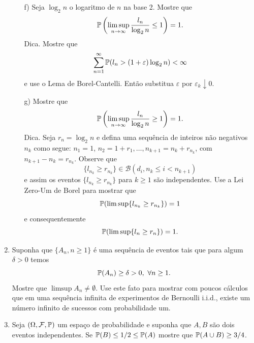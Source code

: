 \begin{enumerate}[leftmargin=*]
\begin{itemize}
	\item[f)]
	Seja $\log_2 n$ o logaritmo de $n$ na base 2. 
	Mostre que 
		\[
			\P\left(
				\limsup_{n\to\infty} \frac{l_n}{\log_2 n}\leq 1
			\right)
			=1.
		\]
	Dica. Mostre que 
		\[
			\sum_{n=1}^{\infty}
			\P(l_n>(1+\varepsilon)\log_2 n)<\infty
		\]
	e use o Lema de Borel-Cantelli. Então substitua $\varepsilon$ 
	por $\varepsilon_k\downarrow 0$.
	
	\item[g)] 
	Mostre que 
		\[
			\P\left(
				\limsup_{n\to\infty} \frac{l_n}{\log_2 n}\geq 1
			\right)
			=1.
		\]
	Dica. Seja $r_n =\log_2 n$ e defina uma sequência 
	de inteiros não negativos $n_k$ como segue:
	$n_1=1$, $n_2=1+r_1,\ldots, n_{k+1}=n_k+r_{n_k}$, com 
	$n_{k+1}-n_{k}=r_{n_k}$.
	Observe que 
		\[
			\{l_{n_k}\geq r_{n_k}\}\in 
			\mathscr{B}(d_i, n_k\leq i <n_{k+1})
		\]
	e assim os eventos $\{l_{n_k}\geq r_{n_k}\}$ para
	$k\geq 1$ são independentes. Use a Lei Zero-Um de Borel
	para mostrar que 
		\[
			\P(\limsup \{ l_{n_k} \geq r_{n_k} \}) = 1
		\]
	e consequentemente 
		\[
			\P(\limsup \{ l_{n} \geq r_{n} \}) = 1.
		\]
		
	\end{itemize}






























\item Suponha que $\{A_n, n\geq 1\}$ é uma sequência de eventos 
tais que para algum $\delta>0$ temos 
	\[
		\P(A_n)\geq \delta >0, \ \forall n\geq 1.
	\]
Mostre que $\limsup A_n \neq \emptyset$.
Use este fato para mostrar com poucos cálculos que em 
uma sequência infinita de experimentos de Bernoulli i.i.d., 
existe um número infinito de sucessos com probabilidade
um.






\item 
Seja $(\Omega,\F,\P)$ um espaço de probabilidade e 
suponha que $A,B$ são dois eventos independentes.
Se $\P(B)\leq 1/2\leq \P(A)$ mostre que 
$\P(A\cup B)\geq 3/4$.







\end{enumerate}
